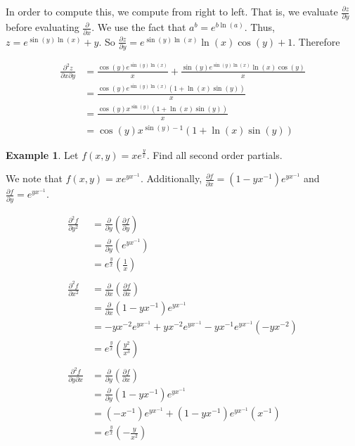 \documentclass[11pt]{article}
\theoremstyle{plain} %
\theoremstyle{definition}
\theoremstyle{example}
\newtheorem*{example}{Example}
\theoremstyle{remark}
\begin{document}
In order to compute this, we compute from right to left. That is, we evaluate $\frac{\partial z}{\partial y}$ before evaluating $\frac{\partial }{\partial x }$. We use the fact that $a^b = e^{b\ln(a)}$. Thus, $z=e^{\sin(y)\ln(x)}+y$. So $\frac{\partial z}{\partial y} = e^{\sin(y)\ln(x)}\ln(x)\cos(y)+1$. Therefore 



\begin{align*}
	\frac{\partial ^2 z}{\partial x \partial y} &= \frac{\cos(y)e^{\sin(y)\ln(x)}}{x} + \frac{\sin(y)e^{\sin(y)\ln(x)}\ln(x)\cos(y)}{x}\\
	&= \frac{\cos(y)e^{\sin(y)\ln(x)}\left(1+\ln(x)\sin(y)\right)}{x}\\
	&=\frac{\cos(y)x^{\sin(y)}\left(1+\ln(x)\sin(y)\right)}{x}\\
	&= \cos(y)x^{\sin(y)-1}\left(1+\ln(x)\sin(y)\right)
\end{align*}

\begin{example}
Let $f(x, y) = xe^{\frac{y}{x}}$. Find all second order partials.
\end{example}

We note that $f(x, y) = xe^{yx^{-1}}$. Additionally, $\frac{\partial f}{\partial x} = \left(1-yx^{-1}\right)e^{yx^{-1}}$ and $\frac{\partial f}{\partial y} = e^{yx^{-1}}$.

\begin{align*}
	\frac{\partial^2 f}{\partial y^2} &= \frac{\partial}{\partial y}\left(\frac{\partial f}{\partial y} \right)\\
	&= \frac{\partial}{\partial y}\left(e^{yx^{-1}} \right)\\
	&= e^{\frac{y}{x}}\left(\frac{1}{x}\right)\\
	\\
	\frac{\partial^2 f}{\partial x^2} &= \frac{\partial}{\partial x}\left(\frac{\partial f}{\partial x} \right)\\
	&= \frac{\partial}{\partial x}\left(1-yx^{-1}\right)e^{yx^{-1}}\\
	&= -yx^{-2}e^{yx^{-1}}+yx^{-2}e^{yx^{-1}}-yx^{-1}e^{yx^{-1}}\left(-yx^{-2}\right)\\
	&=e^{\frac{y}{x}}\left(\frac{y^2}{x^3}\right)\\
	\\
	\frac{\partial^2 f}{\partial y \partial x} &= \frac{\partial}{\partial y}\left(\frac{\partial f}{\partial x} \right)\\
	&= \frac{\partial}{\partial y}\left(1-yx^{-1}\right)e^{yx^{-1}}\\
	&= \left(-x^{-1}\right)e^{yx^{-1}} + \left(1-yx^{-1}\right)e^{yx^{-1}}\left(x^{-1}\right)\\
	&= e^{\frac{y}{x}}\left(-\frac{y}{x^2}\right)\\
\end{align*}
\end{document}
